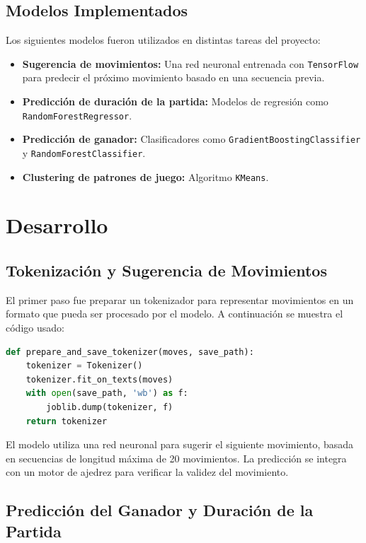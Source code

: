 \documentclass[a4paper,12pt]{article}
\begin{document}
\subsection{Modelos Implementados}

Los siguientes modelos fueron utilizados en distintas tareas del proyecto:
\begin{itemize}
    \item \textbf{Sugerencia de movimientos:} Una red neuronal entrenada con \texttt{TensorFlow} para predecir el próximo movimiento basado en una secuencia previa.
    \item \textbf{Predicción de duración de la partida:} Modelos de regresión como \texttt{RandomForestRegressor}.
    \item \textbf{Predicción de ganador:} Clasificadores como \texttt{GradientBoostingClassifier} y \texttt{RandomForestClassifier}.
    \item \textbf{Clustering de patrones de juego:} Algoritmo \texttt{KMeans}.
\end{itemize}

\section{Desarrollo}

\subsection{Tokenización y Sugerencia de Movimientos}

El primer paso fue preparar un tokenizador para representar movimientos en un formato que pueda ser procesado por el modelo. A continuación se muestra el código usado:

\begin{lstlisting}[language=Python]
def prepare_and_save_tokenizer(moves, save_path):
    tokenizer = Tokenizer()
    tokenizer.fit_on_texts(moves)
    with open(save_path, 'wb') as f:
        joblib.dump(tokenizer, f)
    return tokenizer
\end{lstlisting}

El modelo utiliza una red neuronal para sugerir el siguiente movimiento, basada en secuencias de longitud máxima de 20 movimientos. La predicción se integra con un motor de ajedrez para verificar la validez del movimiento.

\newpage

\subsection{Predicción del Ganador y Duración de la Partida}
\end{document}
